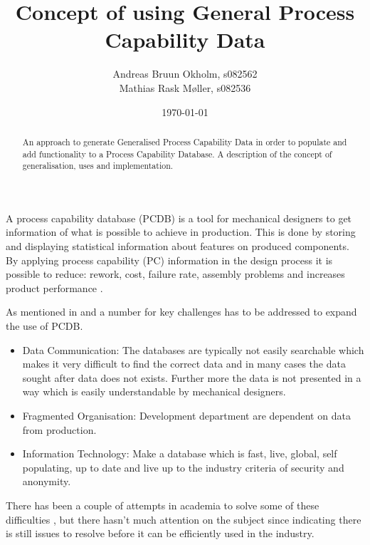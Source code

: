 \documentclass[aip,amsmath, reprint, author-year]{revtex4-1}
\begin{document}
\begin{abstract}
An approach to generate Generalised Process Capability Data in order to populate and add functionality to a Process Capability Database.
A description of the concept of generalisation, uses and implementation.
\end{abstract}

\title{Concept of using General Process Capability Data}
\author{Andreas Bruun Okholm, s082562\\
Mathias Rask Møller, s082536 }
 
\date{\today}
\maketitle


A process capability database (PCDB) is a tool for mechanical designers to get information of what is possible to achieve in production. This is done by storing and displaying statistical information about features on produced components.  
By applying process capability (PC) information in the design process it is possible to reduce: rework, cost, failure rate, assembly problems and increases product performance \citep{tata1999process}.

As mentioned in \citep{tata1999process, tata1999effective, raskokholm} and a number for key challenges has to be addressed to expand the use of PCDB.
\begin{itemize}
	\item Data Communication: The databases are typically not easily searchable which makes it very difficult to find the correct data and in many cases the data sought after data does not exists. Further more the data is not presented in a way which is easily understandable by mechanical designers.
	\item Fragmented Organisation: Development department are dependent on data from production. 
	\item Information Technology: Make a database which is fast, live, global, self populating, up to date and live up to the industry criteria of security and anonymity.
\end{itemize}

There has been a couple of attempts in academia to solve some of these difficulties \citep{thornton2000use, kern2003forecasting, thornton2004variation}, but there hasn't much attention on the subject since indicating there is still issues to resolve before it can be efficiently used in the industry.
\end{document}
